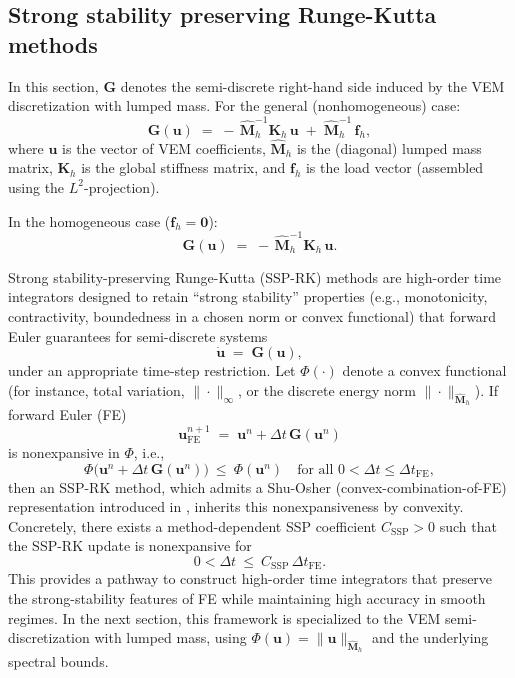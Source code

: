 \documentclass{article}
\renewcommand{\u}{\mathbf{u}}
\newcommand{\K}{\mathbf{K}_h}
\newcommand{\M}{\hat{\mathbf{M}}_h}
\begin{document}
\subsection{Strong stability preserving Runge-Kutta methods}
\label{sec:runge_kutta}

In this section, $\mathbf{G}$ denotes the semi-discrete right-hand side induced by the VEM discretization with lumped mass. For the general (nonhomogeneous) case:
\begin{equation}
    \nonumber
  \mathbf{G}(\u) \;=\; -\,\M^{-1}\K\,\u \;+\; \M^{-1}\,\mathbf{f}_h,
\end{equation}
where $\u$ is the vector of VEM coefficients, $\M$ is the (diagonal) lumped mass matrix, $\K$ is the global stiffness matrix, and $\mathbf{f}_h$ is the load vector (assembled using the $L^2$-projection).

In the homogeneous case ($\mathbf{f}_h=\mathbf{0}$):
\begin{equation}
    \nonumber
  \mathbf{G}(\u) \;=\; -\,\M^{-1}\K\,\u.
\end{equation}

Strong stability-preserving Runge-Kutta (SSP-RK) methods are high-order time integrators designed to retain “strong stability” properties (e.g., monotonicity, contractivity, boundedness in a chosen norm or convex functional) that forward Euler guarantees for semi-discrete systems
\begin{equation}
    \nonumber
    \dot{\u} \;=\; \mathbf{G}(\u),
\end{equation}
under an appropriate time-step restriction. Let $\Phi(\cdot)$ denote a convex functional (for instance, total variation, $\|\cdot\|_\infty$, or the discrete energy norm $\|\cdot\|_{\M}$). If forward Euler (FE)
\begin{equation}
    \nonumber
    \u^{n+1}_{\mathrm{FE}} \;=\; \u^{n} + \Delta t\,\mathbf{G}(\u^{n})
\end{equation}
is nonexpansive in $\Phi$, i.e.,
\begin{equation}
    \nonumber
    \Phi\!\big(\u^{n} + \Delta t\,\mathbf{G}(\u^{n})\big)\ \le\ \Phi(\u^{n})
    \quad \text{for all } 0<\Delta t\le \Delta t_{\mathrm{FE}},
\end{equation}
then an SSP-RK method, which admits a Shu-Osher (convex-combination-of-FE) representation introduced in \cite{shu1988eno}, inherits this nonexpansiveness by convexity. Concretely, there exists a method-dependent SSP coefficient $C_{\mathrm{SSP}}>0$ such that the SSP-RK update is nonexpansive for
\begin{equation}
    \nonumber
    0<\Delta t\ \le\ C_{\mathrm{SSP}}\,\Delta t_{\mathrm{FE}}.
\end{equation}
This provides a pathway to construct high-order time integrators that preserve the strong-stability features of FE while maintaining high accuracy in smooth regimes. In the next section, this framework is specialized to the VEM semi-discretization with lumped mass, using $\Phi(\u)=\|\u\|_{\M}$ and the underlying spectral bounds.
\end{document}

